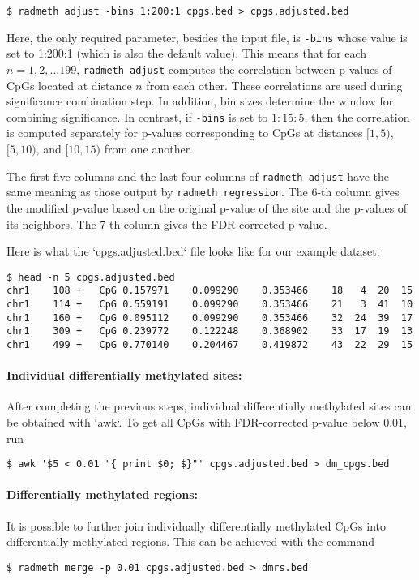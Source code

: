 \documentclass[10pt]{article}
\begin{document}
{\small{%
\begin{verbatim}
$ radmeth adjust -bins 1:200:1 cpgs.bed > cpgs.adjusted.bed
\end{verbatim}%
}}

Here, the only required parameter, besides the input file, is {\tt -bins} whose
value is set to 1:200:1 (which is also the default value). This means that for 
each $n = 1, 2, . . . 199$, {\tt radmeth adjust} computes the correlation between 
p-values of CpGs located at distance $n$ from each other. These correlations are 
used during significance combination step. In addition, bin sizes determine the 
window for combining significance. In contrast, if {\tt -bins} is set to $1:15:5$, 
then the correlation is computed separately for p-values corresponding to CpGs at 
distances $[1, 5)$, $[5, 10)$, and $[10, 15)$ from one another.

The first five columns and the last four columns of {\tt radmeth adjust} have the
same meaning as those output by {\tt radmeth regression}. The 6-th column gives 
the modified p-value based on the original p-value of the site and the p-values 
of its neighbors. The 7-th column gives the FDR-corrected p-value.

Here is what the `cpgs.adjusted.bed` ﬁle looks like for our example dataset:

{\small{%
\begin{verbatim}
$ head -n 5 cpgs.adjusted.bed
chr1	108	+	CpG	0.157971	0.099290	0.353466	18	 4	20	15
chr1	114	+	CpG	0.559191	0.099290	0.353466	21	 3	41	10
chr1	160	+	CpG	0.095112	0.099290	0.353466	32	24	39	17
chr1	309	+	CpG	0.239772	0.122248	0.368902	33	17	19	13
chr1	499	+	CpG	0.770140	0.204467	0.419872	43	22	29	15
\end{verbatim}%
}}

\paragraph{Individual differentially methylated sites:} After completing the 
previous steps, individual differentially methylated sites can be obtained with 
`awk`. To get all CpGs with FDR-corrected p-value below 0.01, run

{\small{%
\begin{verbatim}
$ awk '$5 < 0.01 "{ print $0; $}"' cpgs.adjusted.bed > dm_cpgs.bed
\end{verbatim}%
}}

\paragraph{Differentially methylated regions:} It is possible to further join 
individually differentially methylated CpGs into differentially methylated 
regions. This can be achieved with the command
{\small{%
\begin{verbatim}
$ radmeth merge -p 0.01 cpgs.adjusted.bed > dmrs.bed
\end{verbatim}%
}}
\end{document}
